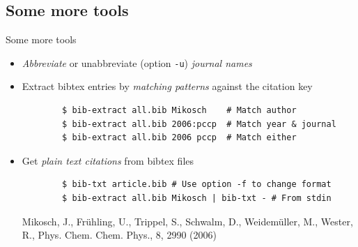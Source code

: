 \documentclass[xcolor={table,dvipsnames}]{beamer}
\renewcommand{\emph}[1]{\textit{\color{orange!90!brown}#1}}
\newcommand{\faint}{\color{black!10!gray}}
\newcommand{\bashcmd}[2][-0.6\baselineskip]{%
  \vspace{#1}%
}
\newcommand{\bashout}[2][-0.1\baselineskip]{%
  \vspace{#1}%
}
\begin{document}
\subsection{Some more tools}
\begin{frame}[fragile]{Some more tools}
  \begin{itemize}

    \item \emph{Abbreviate} or unabbreviate
      (option {\faint\verb!-u!}) \emph{journal names}
      \bashcmd{cmdline/jabbr/jabbr-1-in.txt}
      \bashout{cmdline/jabbr/jabbr-1-out.txt}

    \item Extract bibtex entries by \emph{matching patterns} against the citation key
      \begin{lstlisting}
        $ bib-extract all.bib Mikosch    # Match author
        $ bib-extract all.bib 2006:pccp  # Match year & journal
        $ bib-extract all.bib 2006 pccp  # Match either
      \end{lstlisting}

    \item Get \emph{plain text citations} from bibtex files
      \begin{lstlisting}
        $ bib-txt article.bib # Use option -f to change format
        $ bib-extract all.bib Mikosch | bib-txt - # From stdin
      \end{lstlisting}
      {\faint\footnotesize Mikosch, J., Frühling, U., Trippel, S., Schwalm, D.,
	Weidemüller, M., Wester, R., Phys. Chem. Chem. Phys., 8, 2990 (2006) }

  \end{itemize}
\end{frame}
\end{document}
